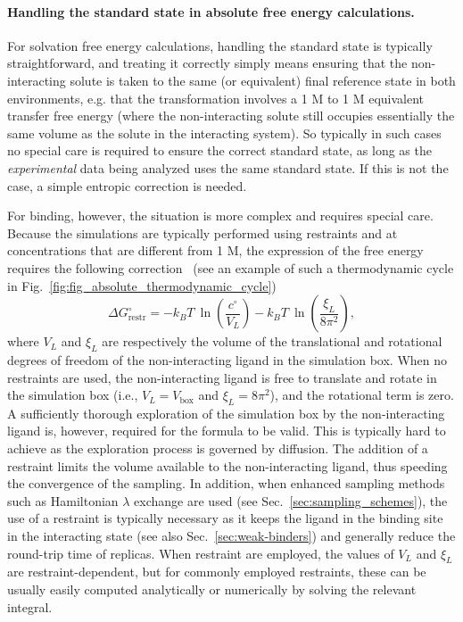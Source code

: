\documentclass[9pt,bestpractices]{livecoms}
\begin{document}
\paragraph{Handling the standard state in absolute free energy calculations.}
For solvation free energy calculations, handling the standard state is typically straightforward, and treating it correctly simply means ensuring that the non-interacting solute is taken to the same (or equivalent) final reference state in both environments, e.g. that the transformation involves a 1 M to 1 M equivalent transfer free energy (where the non-interacting solute still occupies essentially the same volume as the solute in the interacting system).
So typically in such cases no special care is required to ensure the correct standard state, as long as the \emph{experimental} data being analyzed uses the same standard state.
If this is not the case, a simple entropic correction is needed.

For binding, however, the situation is more complex and requires special care.
Because the simulations are typically performed using restraints and at concentrations that are different from 1 M, the expression of the free energy requires the following correction~\cite{gilson1997statisticalthermodynamic} (see an example of such a thermodynamic cycle in Fig.~\ref{fig:fig_absolute_thermodynamic_cycle})
\begin{equation}\label{eq:restraint-correction}
    \Delta G^{\circ}_{\mathrm{restr}} = -k_BT ~ \ln \left( \frac{c^{\circ}}{V_L} \right) -k_BT ~ \ln \left( \frac{\xi_L}{8 \pi^2} \right),
\end{equation}
where $V_L$ and $\xi_L$ are respectively the volume of the translational and rotational degrees of freedom of the non-interacting ligand in the simulation box.
When no restraints are used, the non-interacting ligand is free to translate and rotate in the simulation box (i.e., $V_L = V_{\mathrm{box}}$ and $\xi_L = 8\pi^2$), and the rotational term is zero.
A sufficiently thorough exploration of the simulation box by the non-interacting ligand is, however, required for the formula to be valid.
This is typically hard to achieve as the exploration process is governed by diffusion.
The addition of a restraint limits the volume available to the non-interacting ligand, thus speeding the convergence of the sampling.
In addition, when enhanced sampling methods such as Hamiltonian $\lambda$ exchange are used (see Sec.~\ref{sec:sampling_schemes}), the use of a restraint is typically necessary as it keeps the ligand in the binding site in the interacting state (see also Sec.~\ref{sec:weak-binders}) and generally reduce the round-trip time of replicas.
When restraint are employed, the values of $V_L$ and $\xi_L$ are restraint-dependent, but for commonly employed restraints, these can be usually easily computed analytically or numerically by solving the relevant integral.
\end{document}
